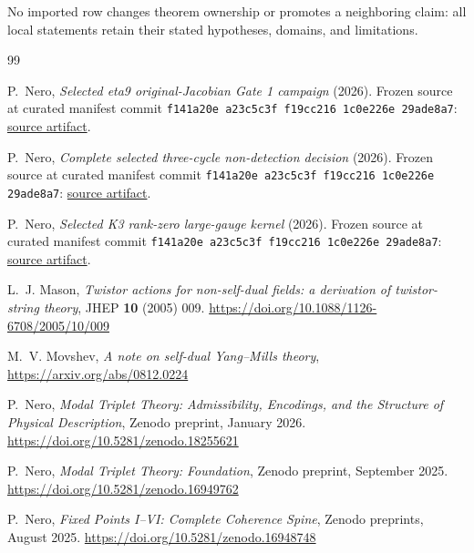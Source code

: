 \documentclass[11pt]{article}
\begin{document}
No imported row changes theorem ownership or promotes a neighboring claim: all local statements retain their stated hypotheses, domains, and limitations.

\begin{thebibliography}{99}

P.~Nero, \emph{Selected eta9 original-Jacobian Gate 1 campaign} (2026).
Frozen source at curated manifest commit
\texttt{f141a20e a23c5c3f f19cc216 1c0e226e 29ade8a7}:
\href{https://github.com/PeterNero/mtt-results-repro/blob/f141a20ea23c5c3ff19cc2161c0e226e29ade8a7/release/results/eta9_gate1_campaign/artifact.json}{source artifact}.

P.~Nero, \emph{Complete selected three-cycle non-detection decision} (2026).
Frozen source at curated manifest commit
\texttt{f141a20e a23c5c3f f19cc216 1c0e226e 29ade8a7}:
\href{https://github.com/PeterNero/mtt-results-repro/blob/f141a20ea23c5c3ff19cc2161c0e226e29ade8a7/release/results/eta9_three_cycle_b96_nondetection/artifact.json}{source artifact}.

P.~Nero, \emph{Selected K3 rank-zero large-gauge kernel} (2026).
Frozen source at curated manifest commit
\texttt{f141a20e a23c5c3f f19cc216 1c0e226e 29ade8a7}:
\href{https://github.com/PeterNero/mtt-results-repro/blob/f141a20ea23c5c3ff19cc2161c0e226e29ade8a7/release/results/q79_bk3_rank_zero_kernel/artifact.json}{source artifact}.

L.~J. Mason,
\emph{Twistor actions for non-self-dual fields: a derivation of
twistor-string theory},
JHEP \textbf{10} (2005) 009.
\url{https://doi.org/10.1088/1126-6708/2005/10/009}

M.~V. Movshev,
\emph{A note on self-dual Yang--Mills theory},
\url{https://arxiv.org/abs/0812.0224}

P.~Nero,
\emph{Modal Triplet Theory: Admissibility, Encodings, and the Structure of Physical Description},
Zenodo preprint, January 2026.
\url{https://doi.org/10.5281/zenodo.18255621}

P.~Nero,
\emph{Modal Triplet Theory: Foundation},
Zenodo preprint, September 2025.
\url{https://doi.org/10.5281/zenodo.16949762}

P.~Nero,
\emph{Fixed Points I--VI: Complete Coherence Spine},
Zenodo preprints, August 2025.
\url{https://doi.org/10.5281/zenodo.16948748}


\end{thebibliography}
\end{document}
